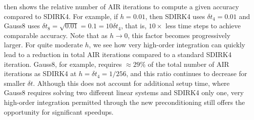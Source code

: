 \documentclass[review]{siamart}
\begin{document}
 then shows the relative number of AIR iterations to
compute a given accuracy compared to SDIRK4. For example, if $h=0.01$,
then SDIRK4 uses $\delta t_4 = 0.01$ and Gauss8 uses $\delta t_8 =
\sqrt{0.01} = 0.1 = 10\delta t_4$, that is, $10\times$ less time steps to
achieve comparable accuracy. Note that as $h\to 0$, this factor becomes progressively
larger. For quite moderate $h$, we see how very high-order integration
can quickly lead to a reduction in total AIR iterations compared to a
standard SDIRK4 iteration. Gauss8, for example, requires $\approx 29\%$
of the total number of AIR iterations as SDIRK4 at $h =\delta t_4 = 1/256$,
and this ratio continues to decrease for smaller $\delta t$. Although this
does not account for additional setup time, where Gauss8 requires solving
two different linear systems and SDIRK4 only one, very high-order integration
permitted through the new preconditioning still offers the opportunity
for significant speedups.
\end{document}
